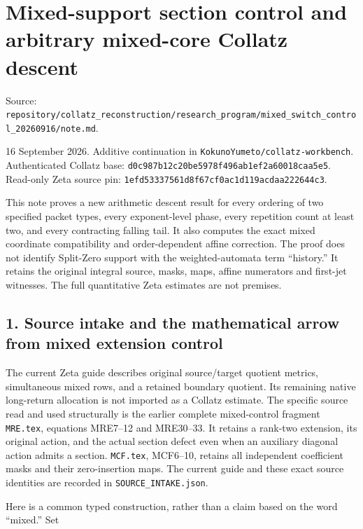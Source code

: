 \chapter{Mixed-support section control and arbitrary mixed-core Collatz
descent}
{\small\sffamily Source: \nolinkurl{repository/collatz_reconstruction/research_program/mixed_switch_control_20260916/note.md}.\par}


16 September 2026. Additive continuation in
\nolinkurl{KokunoYumeto/collatz-workbench}. Authenticated Collatz base:
\nolinkurl{d0c987b12c20be5978f496ab1ef2a60018caa5e5}. Read-only Zeta
source pin: \nolinkurl{1efd53337561d8f67cf0ac1d119acdaa222644c3}.

This note proves a new arithmetic descent result for every ordering of
two specified packet types, every exponent-level phase, every repetition
count at least two, and every contracting falling tail. It also computes
the exact mixed coordinate compatibility and order-dependent affine
correction. The proof does not identify Split-Zero support with the
weighted-automata term ``history.'' It retains the original integral
source, masks, maps, affine numerators and first-jet witnesses. The full
quantitative Zeta estimates are not premises.

\section{1. Source intake and the mathematical arrow from mixed
extension control}

The current Zeta guide describes original source/target quotient
metrics, simultaneous mixed rows, and a retained boundary quotient. Its
remaining native long-return allocation is not imported as a Collatz
estimate. The specific source read and used structurally is the earlier
complete mixed-control fragment \nolinkurl{MRE.tex}, equations MRE7--12
and MRE30--33. It retains a rank-two extension, its original action, and
the actual section defect even when an auxiliary diagonal action admits
a section. \nolinkurl{MCF.tex}, MCF6--10, retains all independent
coefficient masks and their zero-insertion maps. The current guide and
these exact source identities are recorded in
\nolinkurl{SOURCE_INTAKE.json}.

Here is a common typed construction, rather than a claim based on the
word ``mixed.'' Set


